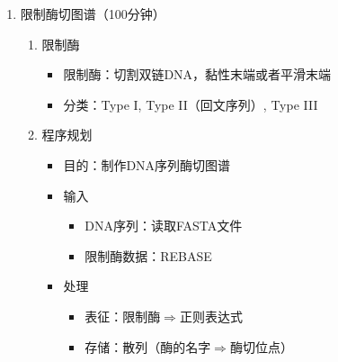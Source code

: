 \documentclass{TIJMUjiaoanLL}
\begin{document}
\begin{enumerate}
\begin{enumerate}
      \item 生物学应用\textcolor{red}{（综合运用前述理论知识，讲解正则表达式在专业中的应用）}
	\vspace{-1em}
	\begin{multicols}{2}
	  \begin{itemize}
	    \item 匹配1～6号染色体
	    \item 匹配任意一个碱基/核苷酸
	    \item \textit{Bst}YI的切割序列（RGATCY）
	    \item \verb|<A-X-[ST](2)-X(0,1)-{V}|
	  \end{itemize}
	  \begin{itemize}
	    \item \verb|/chr[1-6]/|
	    \item \verb|/[ACGTU]/|
	    \item \verb|/[AG]GATC[TC]/|
	    \item \verb|/^A.[ST]{2}.?[^V]/|
	  \end{itemize}
	\end{multicols}
	\vspace{-1em}
    \end{enumerate}
  \item 限制酶切图谱（100分钟）
    \begin{enumerate}
      \item 限制酶
	\begin{itemize}
	  \item 限制酶：切割双链DNA，黏性末端或者平滑末端
	  \item 分类：Type I, Type II（回文序列）, Type III
	\end{itemize}
      \item 程序规划
	\begin{itemize}
	  \item 目的：制作DNA序列酶切图谱
	  \item 输入
	    \begin{itemize}
	      \item DNA序列：读取FASTA文件
	      \item 限制酶数据：REBASE
	    \end{itemize}
	  \item 处理
	    \begin{itemize}
	      \item 表征：限制酶$\Rightarrow$正则表达式
	      \item 存储：散列（酶的名字$\Rightarrow$酶切位点）

\end{itemize}
\end{itemize}
\end{enumerate}
\end{enumerate}
\end{document}

